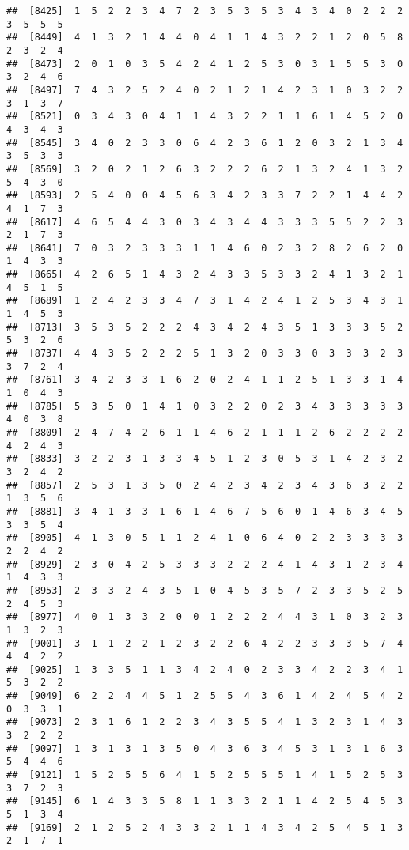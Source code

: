 \documentclass[
]{article}
\begin{document}
\begin{verbatim}
##  [8425]  1  5  2  2  3  4  7  2  3  5  3  5  3  4  3  4  0  2  2  2  3  5  5  5
##  [8449]  4  1  3  2  1  4  4  0  4  1  1  4  3  2  2  1  2  0  5  8  2  3  2  4
##  [8473]  2  0  1  0  3  5  4  2  4  1  2  5  3  0  3  1  5  5  3  0  3  2  4  6
##  [8497]  7  4  3  2  5  2  4  0  2  1  2  1  4  2  3  1  0  3  2  2  3  1  3  7
##  [8521]  0  3  4  3  0  4  1  1  4  3  2  2  1  1  6  1  4  5  2  0  4  3  4  3
##  [8545]  3  4  0  2  3  3  0  6  4  2  3  6  1  2  0  3  2  1  3  4  3  5  3  3
##  [8569]  3  2  0  2  1  2  6  3  2  2  2  6  2  1  3  2  4  1  3  2  5  4  3  0
##  [8593]  2  5  4  0  0  4  5  6  3  4  2  3  3  7  2  2  1  4  4  2  4  1  7  3
##  [8617]  4  6  5  4  4  3  0  3  4  3  4  4  3  3  3  5  5  2  2  3  2  1  7  3
##  [8641]  7  0  3  2  3  3  3  1  1  4  6  0  2  3  2  8  2  6  2  0  1  4  3  3
##  [8665]  4  2  6  5  1  4  3  2  4  3  3  5  3  3  2  4  1  3  2  1  4  5  1  5
##  [8689]  1  2  4  2  3  3  4  7  3  1  4  2  4  1  2  5  3  4  3  1  1  4  5  3
##  [8713]  3  5  3  5  2  2  2  4  3  4  2  4  3  5  1  3  3  3  5  2  5  3  2  6
##  [8737]  4  4  3  5  2  2  2  5  1  3  2  0  3  3  0  3  3  3  2  3  3  7  2  4
##  [8761]  3  4  2  3  3  1  6  2  0  2  4  1  1  2  5  1  3  3  1  4  1  0  4  3
##  [8785]  5  3  5  0  1  4  1  0  3  2  2  0  2  3  4  3  3  3  3  3  4  0  3  8
##  [8809]  2  4  7  4  2  6  1  1  4  6  2  1  1  1  2  6  2  2  2  2  4  2  4  3
##  [8833]  3  2  2  3  1  3  3  4  5  1  2  3  0  5  3  1  4  2  3  2  3  2  4  2
##  [8857]  2  5  3  1  3  5  0  2  4  2  3  4  2  3  4  3  6  3  2  2  1  3  5  6
##  [8881]  3  4  1  3  3  1  6  1  4  6  7  5  6  0  1  4  6  3  4  5  3  3  5  4
##  [8905]  4  1  3  0  5  1  1  2  4  1  0  6  4  0  2  2  3  3  3  3  2  2  4  2
##  [8929]  2  3  0  4  2  5  3  3  3  2  2  2  4  1  4  3  1  2  3  4  1  4  3  3
##  [8953]  2  3  3  2  4  3  5  1  0  4  5  3  5  7  2  3  3  5  2  5  2  4  5  3
##  [8977]  4  0  1  3  3  2  0  0  1  2  2  2  4  4  3  1  0  3  2  3  1  3  2  3
##  [9001]  3  1  1  2  2  1  2  3  2  2  6  4  2  2  3  3  3  5  7  4  4  4  2  2
##  [9025]  1  3  3  5  1  1  3  4  2  4  0  2  3  3  4  2  2  3  4  1  5  3  2  2
##  [9049]  6  2  2  4  4  5  1  2  5  5  4  3  6  1  4  2  4  5  4  2  0  3  3  1
##  [9073]  2  3  1  6  1  2  2  3  4  3  5  5  4  1  3  2  3  1  4  3  3  2  2  2
##  [9097]  1  3  1  3  1  3  5  0  4  3  6  3  4  5  3  1  3  1  6  3  5  4  4  6
##  [9121]  1  5  2  5  5  6  4  1  5  2  5  5  5  1  4  1  5  2  5  3  3  7  2  3
##  [9145]  6  1  4  3  3  5  8  1  1  3  3  2  1  1  4  2  5  4  5  3  5  1  3  4
##  [9169]  2  1  2  5  2  4  3  3  2  1  1  4  3  4  2  5  4  5  1  3  2  1  7  1

\end{verbatim}
\end{document}
